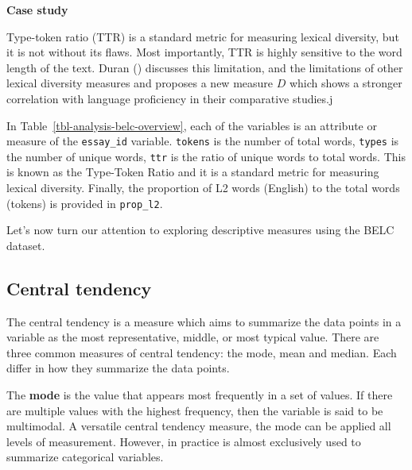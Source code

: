 \documentclass[
  letterpaper,
  krantz1]{latex/krantz-mod}
\theoremstyle{definition}
\theoremstyle{definition}
\theoremstyle{remark}
\begin{document}
\begin{tcolorbox}[enhanced jigsaw, toprule=.15mm, breakable, colback=white, arc=.35mm, left=2mm, colframe=quarto-callout-color-frame, opacityback=0, bottomrule=.15mm, rightrule=.15mm, leftrule=.75mm]

\textbf{ Case study}

Type-token ratio (TTR) is a standard
metric for measuring lexical diversity, but it is not without its flaws.
Most importantly, TTR is highly sensitive to the word length of the
text. Duran () discusses this limitation,
and the limitations of other lexical diversity
measures and proposes a new measure \(D\) which shows a stronger
correlation with language proficiency in their comparative
studies.j

\end{tcolorbox}

In Table~\ref{tbl-analysis-belc-overview}, each of the variables is an
attribute or measure of the \texttt{essay\_id} variable. \texttt{tokens}
is the number of total words, \texttt{types} is the number of unique
words, \texttt{ttr} is the ratio of unique words to total words. This is
known as the Type-Token Ratio and it is a standard metric for measuring
lexical diversity. Finally, the proportion of L2 words (English) to the
total words (tokens) is provided in \texttt{prop\_l2}.

Let's now turn our attention to exploring descriptive measures using the
BELC dataset.

\subsection{Central tendency}\label{sec-analysis-central-tendency}

The central tendency is a measure which aims to
summarize the data points in a variable as the most representative,
middle, or most typical value. There are three common measures of
central tendency: the mode, mean and median. Each differ in how they
summarize the data points.

The \textbf{mode} is the value that appears most frequently
in a set of values. If there are multiple values with the highest
frequency, then the variable is said to be multimodal.
A versatile central tendency measure, the mode can be applied all levels
of measurement. However, in practice is almost exclusively used to
summarize categorical variables.
\end{document}

